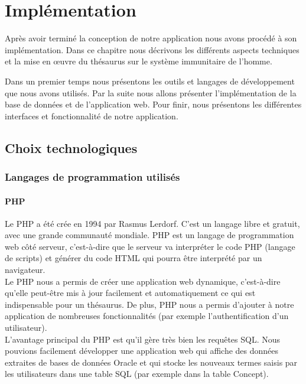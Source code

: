 \chapter{Implémentation}

Après avoir terminé la conception de notre application nous avons procédé à son implémentation. Dans ce chapitre nous décrivons les différents aspects techniques et la mise en œuvre du thésaurus sur le système immunitaire de l'homme.

Dans un premier temps nous présentons les outils et langages de développement que nous avons utilisés.
Par la suite nous allons présenter l'implémentation de la base de données et de l'application web.
Pour finir, nous présentons les différentes interfaces et fonctionnalité de notre application.

\section{Choix technologiques}

\subsection{Langages de programmation utilisés}

\subsubsection{PHP}

Le PHP a été crée en 1994 par Rasmus Lerdorf. C'est un langage libre et gratuit, avec une grande communauté mondiale. PHP est un langage de programmation web côté serveur, c'est-à-dire que le serveur va interpréter le code PHP (langage de scripts) et générer du code HTML qui pourra être interprété par un navigateur.\\

Le PHP nous a permis de créer une application web dynamique, c'est-à-dire qu'elle peut-être mis à jour facilement et automatiquement ce qui est indispensable pour un thésaurus. De plus, PHP nous a permis d'ajouter à notre application de nombreuses fonctionnalités (par exemple l'authentification d'un utilisateur). \\

L'avantage principal du PHP est qu'il gère très bien les requêtes SQL. Nous pouvions facilement développer une application web qui  affiche des données extraites de bases de données Oracle et qui stocke les nouveaux termes saisis par les utilisateurs dans une table SQL (par exemple dans la table Concept). \\

